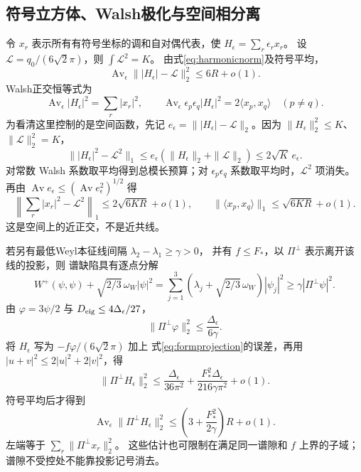 \documentclass[UTF8,a4paper,11pt,fontset=fandol]{ctexart}
\numberwithin{equation}{section}
\theoremstyle{definition}
\begin{document}
\subsection{符号立方体、Walsh极化与空间相分离}
令 $x_r$ 表示所有有符号坐标的调和自对偶代表，使
$H_\epsilon=\sum_r\epsilon_rx_r$。
设 $\mathcal L=q_0/(6\sqrt2\pi)$，则 $\int\mathcal L^2=K$。
由式\eqref{eq:harmonicnorm}及符号平均，
\[
\operatorname{Av}_\epsilon\||H_\epsilon|-\mathcal L\|_2^2\le6R+o(1).
\]
Walsh正交恒等式为
\[
\operatorname{Av}_\epsilon|H_\epsilon|^2=\sum_r|x_r|^2,\qquad
\operatorname{Av}_\epsilon\epsilon_p\epsilon_q|H_\epsilon|^2
=2\langle x_p,x_q\rangle\quad(p\ne q).
\]
为看清这里控制的是空间函数，先记
$e_\epsilon=\||H_\epsilon|-\mathcal L\|_2$。因为
$\|H_\epsilon\|_2^2\le K$、$\|\mathcal L\|_2^2=K$，
\[
\bigl\||H_\epsilon|^2-\mathcal L^2\bigr\|_1
\le e_\epsilon(\|H_\epsilon\|_2+\|\mathcal L\|_2)
\le2\sqrt K\,e_\epsilon.
\]
对常数 Walsh 系数取平均得到总模长预算；对
$\epsilon_p\epsilon_q$ 系数取平均时，$\mathcal L^2$ 项消失。
再由 $\operatorname{Av}e_\epsilon\le(\operatorname{Av}e_\epsilon^2)^{1/2}$ 得
\begin{equation}\label{eq:walsh}
\left\|\sum_r|x_r|^2-\mathcal L^2\right\|_1\le2\sqrt{6KR}+o(1),\qquad
\|\langle x_p,x_q\rangle\|_1\le\sqrt{6KR}+o(1).
\end{equation}
这是空间上的近正交，不是近共线。

若另有最低Weyl本征线间隔 $\lambda_2-\lambda_1\ge\gamma>0$，
并有 $f\le F_*$，以 $\Pi^\perp$ 表示离开该线的投影，则
谱缺陷具有逐点分解
\begin{equation}\label{eq:eigenline-deficit}
W^+(\psi,\psi)+\sqrt{2/3}\,\omega_W|\psi|^2
=\sum_{j=1}^3(\lambda_j+\sqrt{2/3}\,\omega_W)|\psi_j|^2
\ge\gamma|\Pi^\perp\psi|^2.
\end{equation}
由 $\varphi=3\psi/2$ 与 $D_{\rm eig}\le4\Delta_\epsilon/27$，
\[
\|\Pi^\perp\varphi\|_2^2\le\frac{\Delta_\epsilon}{6\gamma}.
\]
将 $H_\epsilon$ 写为 $-f\varphi/(6\sqrt2\pi)$ 加上
式\eqref{eq:formprojection}的误差，再用 $|u+v|^2\le2|u|^2+2|v|^2$，得
\[
\|\Pi^\perp H_\epsilon\|_2^2
\le\frac{\Delta_\epsilon}{36\pi^2}
 +\frac{F_*^2\Delta_\epsilon}{216\gamma\pi^2}+o(1).
\]
符号平均后才得到
\[
\operatorname{Av}_\epsilon\|\Pi^\perp H_\epsilon\|_2^2
\le\left(3+\frac{F_*^2}{2\gamma}\right)R+o(1).
\]
左端等于 $\sum_r\|\Pi^\perp x_r\|_2^2$。
这些估计也可限制在满足同一谱隙和 $f$ 上界的子域；
谱隙不受控处不能靠投影记号消去。
\end{document}
